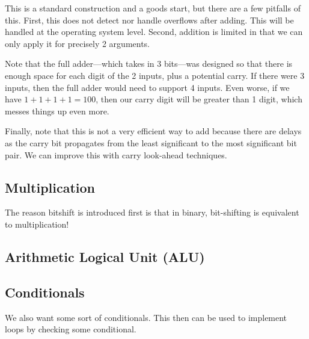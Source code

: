   \begin{corollary}
    
  \end{corollary}

  This is a standard construction and a goods start, but there are a few pitfalls of this. First, this does not detect nor handle overflows after adding. This will be handled at the operating system level. Second, addition is limited in that we can only apply it for precisely 2 arguments. 

  \begin{example}
    Note that the full adder---which takes in 3 bits---was designed so that there is enough space for each digit of the 2 inputs, plus a potential carry. If there were 3 inputs, then the full adder would need to support 4 inputs. Even worse, if we have $1 + 1 + 1 + 1 = 100$, then our carry digit will be greater than 1 digit, which messes things up even more. 
  \end{example}

  Finally, note that this is not a very efficient way to add because there are delays as the carry bit propagates from the least significant to the most significant bit pair. We can improve this with carry look-ahead techniques. 

\subsection{Multiplication} 

  \begin{theorem}
    
  \end{theorem}

  The reason bitshift is introduced first is that in binary, bit-shifting is equivalent to multiplication! 

  \begin{theorem}
    
  \end{theorem}

  \begin{theorem}
    
  \end{theorem}

\subsection{Arithmetic Logical Unit (ALU)}

\subsection{Conditionals}

  We also want some sort of conditionals. This then can be used to implement loops by checking some conditional. 

  \begin{theorem}
    
  \end{theorem}


